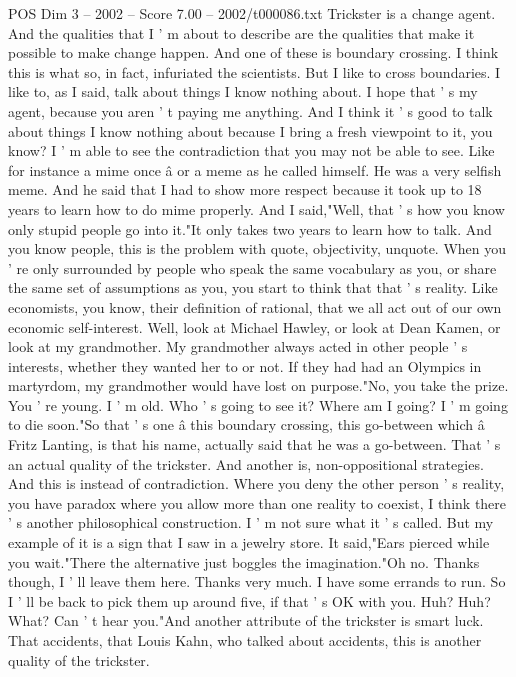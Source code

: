 \begin{textsample}{POS Dim 3 – 2002 – Score 7.00 – 2002/t000086.txt}
Trickster is a change agent.
And the qualities that I ' m about to describe are the qualities that make it possible to make change happen.
And one of these is boundary crossing.
I think this is what so, in fact, infuriated the scientists.
But I like to cross boundaries.
I like to, as I said, talk about things I know nothing about.
I hope that ' s my agent, because you aren ' t paying me anything.
And I think it ' s good to talk about things I know nothing about because I bring a fresh viewpoint to it, you know?
I ' m able to see the contradiction that you may not be able to see.
Like for instance a mime once â or a meme as he called himself.
He was a very selfish meme.
And he said that I had to show more respect because it took up to 18 years to learn how to do mime properly.
And I said,"Well, that ' s how you know only stupid people go into it."It only takes two years to learn how to talk.
And you know people, this is the problem with quote, objectivity, unquote.
When you ' re only surrounded by people who speak the same vocabulary as you, or share the same set of assumptions as you, you start to think that that ' s reality.
Like economists, you know, their definition of rational, that we all act out of our own economic self-interest.
Well, look at Michael Hawley, or look at Dean Kamen, or look at my grandmother.
My grandmother always acted in other people ' s interests, whether they wanted her to or not.
If they had had an Olympics in martyrdom, my grandmother would have lost on purpose."No, you take the prize.
You ' re young.
I ' m old.
Who ' s going to see it?
Where am I going?
I ' m going to die soon."So that ' s one â this boundary crossing, this go-between which â Fritz Lanting, is that his name, actually said that he was a go-between.
That ' s an actual quality of the trickster.
And another is, non-oppositional strategies.
And this is instead of contradiction.
Where you deny the other person ' s reality, you have paradox where you allow more than one reality to coexist, I think there ' s another philosophical construction.
I ' m not sure what it ' s called.
But my example of it is a sign that I saw in a jewelry store.
It said,"Ears pierced while you wait."There the alternative just boggles the imagination."Oh no.
Thanks though, I ' ll leave them here.
Thanks very much.
I have some errands to run.
So I ' ll be back to pick them up around five, if that ' s OK with you.
Huh?
Huh?
What?
Can ' t hear you."And another attribute of the trickster is smart luck.
That accidents, that Louis Kahn, who talked about accidents, this is another quality of the trickster.

\end{textsample}
